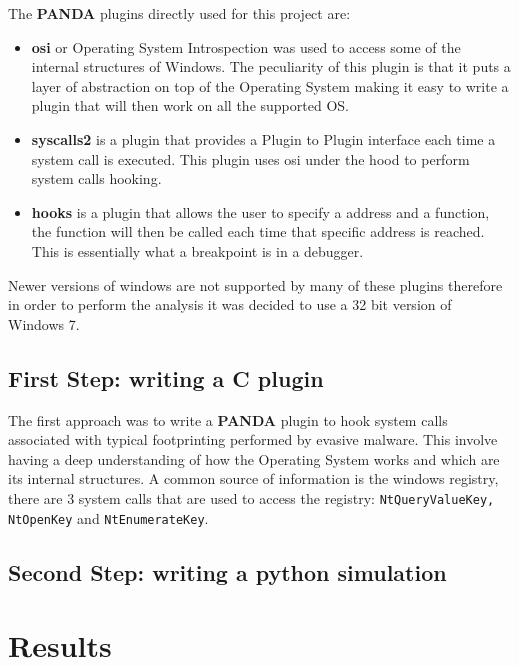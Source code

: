 The \textbf{PANDA} plugins directly used for this project are: 

\begin{itemize}
    \item \textbf{osi} or Operating System Introspection was used to access some of the internal structures of Windows. The peculiarity of this plugin is that it puts a layer of abstraction on top of the Operating System making it easy to write a plugin that will then work on all the supported OS. 
    \item \textbf{syscalls2} is a plugin that provides a Plugin to Plugin interface each time a system call is executed. This plugin uses osi under the hood to perform system calls hooking.
    \item \textbf{hooks} is a plugin that allows the user to specify a address and a function, the function will then be called each time that specific address is reached. This is essentially what a breakpoint is in a debugger.
    
\end{itemize}

Newer versions of windows are not supported by many of these plugins therefore in order to perform the analysis it was decided to use a 32 bit version of Windows 7.


\subsection{First Step: writing a C plugin}

The first approach was to write a \textbf{PANDA} plugin to hook system calls associated with typical footprinting performed by evasive malware. This involve having a deep understanding of how the Operating System works and which are its internal structures. A common source of information is the windows registry, there are 3 system calls that are used to access the registry: \lstinline{NtQueryValueKey, NtOpenKey} and \lstinline{NtEnumerateKey}. 




\subsection{Second Step: writing a python simulation}



\section{Results}

